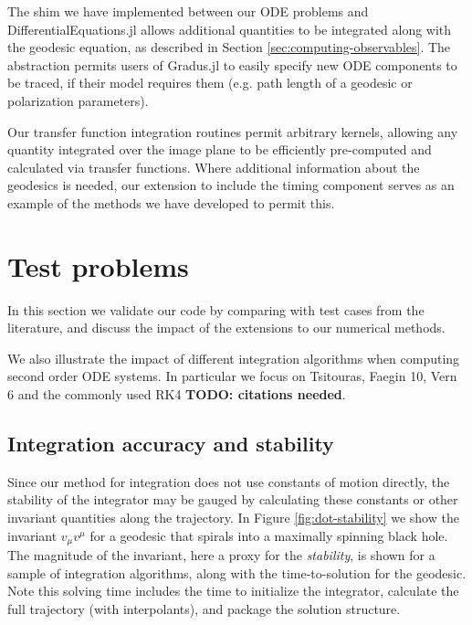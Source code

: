 \documentclass[fleqn,usenatbib]{mnras}
\newcommand{\todo}[1]{{\noindent \bf \color{red} TODO: #1}}
\newcommand{\Gradus}{Gradus.jl\xspace}
\begin{document}
The shim we have implemented between our ODE problems and
DifferentialEquations.jl allows additional quantities to be integrated along
with the geodesic equation, as described in Section
\ref{sec:computing-observables}. The abstraction permits users of \Gradus to
easily specify new ODE components to be traced, if their model requires them
(e.g. path length of a geodesic or polarization parameters).

Our transfer function integration routines permit arbitrary kernels, allowing
any quantity integrated over the image plane to be efficiently pre-computed and
calculated via transfer functions. Where additional information about the
geodesics is needed, our extension to include the timing component serves as an
example of the methods we have developed to permit this.

\section{Test problems}
\label{sec:test-problems}

In this section we validate our code by comparing with test cases from the
literature, and discuss the impact of the extensions to our numerical methods.

We also illustrate the impact of different integration algorithms when
computing second order ODE systems. In particular we focus on Tsitouras, Faegin
10, Vern 6 and the commonly used RK4 \todo{citations needed}.

\subsection{Integration accuracy and stability}

Since our method for integration does not use constants of motion directly, the
stability of the integrator may be gauged by calculating these constants or
other invariant quantities along the trajectory. In Figure
\ref{fig:dot-stability} we show the invariant $v_\mu v^\mu$ for a geodesic that
spirals into a maximally spinning black hole. The magnitude of the invariant,
here a proxy for the \emph{stability}, is shown for a sample of integration algorithms,
along with the time-to-solution for the geodesic. Note this solving time
includes the time to initialize the integrator, calculate the full trajectory
(with interpolants), and package the solution structure.
\end{document}
